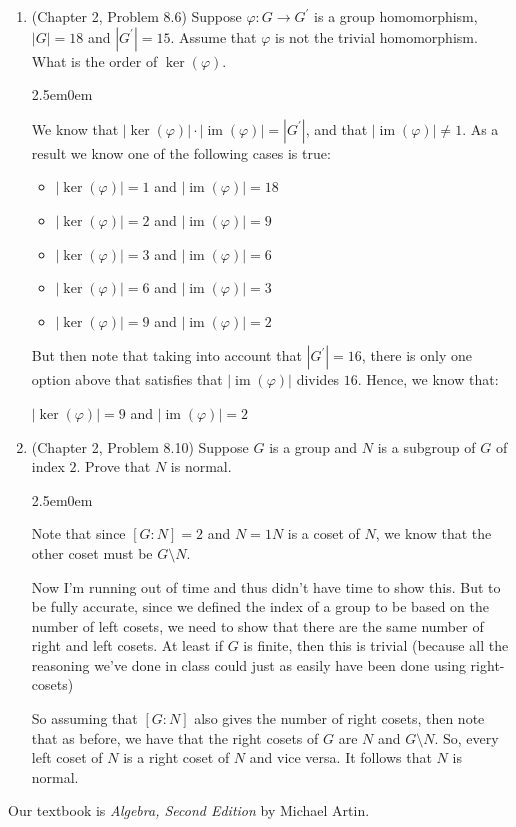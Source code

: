 \documentclass{book}
\newcommand{\exOne}{%
   \color{Purple}%
   \fontsize{13}{15}\selectfont%
}
\newenvironment{myIndent}{%
   \begin{adjustwidth}{2.5em}{0em}%
}{%
   \end{adjustwidth}%
}
\DeclareMathOperator{\im}{im}
\newcommand{\retTwo}{\hfill\bigbreak}
\begin{document}
\begin{enumerate}
	\item (Chapter 2, Problem 8.6) Suppose $\varphi: G \longrightarrow G^\prime$ is a group homomorphism, $|G| = 18$ and $|G^\prime| = 15$. Assume that $\varphi$ is not the trivial homomorphism. What is the order of $\ker(\varphi)$.
	
	\begin{myIndent}\exOne
		We know that $|\ker(\varphi)|\cdot|\im(\varphi)| = |G^\prime|$, and that $|\im(\varphi)| \neq 1$. As a result we know one of the following cases is true:
		\begin{itemize}
			\item $|\ker(\varphi)| = 1$ and $|\im(\varphi)| = 18$
			\item $|\ker(\varphi)| = 2$ and $|\im(\varphi)| = 9$
			\item $|\ker(\varphi)| = 3$ and $|\im(\varphi)| = 6$
			\item $|\ker(\varphi)| = 6$ and $|\im(\varphi)| = 3$
			\item $|\ker(\varphi)| = 9$ and $|\im(\varphi)| = 2$\retTwo
		\end{itemize}
		
		But then note that taking into account that $|G^\prime| = 16$, there is only one option above that satisfies that $|\im(\varphi)|$ divides $16$. Hence, we know that:

		{\center $|\ker(\varphi)| = 9$ and $|\im(\varphi)| = 2$ \retTwo\par}
	\end{myIndent}
	
	\item (Chapter 2, Problem 8.10) Suppose $G$ is a group and $N$ is a subgroup of $G$ of index $2$. Prove that $N$ is normal.
	
	\begin{myIndent}\exOne
		Note that since $[G:N] = 2$ and $N = 1N$ is a coset of $N$, we know that the other coset must be $G \setminus N$.\retTwo

		Now I'm running out of time and thus didn't have time to show this. But to be fully accurate, since we defined the index of a group to be based on the number of left cosets, we need to show that there are the same number of right and left cosets. At least if $G$ is finite, then this is trivial (because all the reasoning we've done in class could just as easily have been done using right-cosets)\retTwo

		So assuming that $[G:N]$ also gives the number of right cosets, then note that as before, we have that the right cosets of $G$ are $N$ and $G \setminus N$. So, every left coset of $N$ is a right coset of $N$ and vice versa. It follows that $N$ is normal.
		\retTwo
	\end{myIndent}
\end{enumerate}



\newpage

\exOne Our textbook is \textit{Algebra, Second Edition} by Michael Artin.
\end{document}
